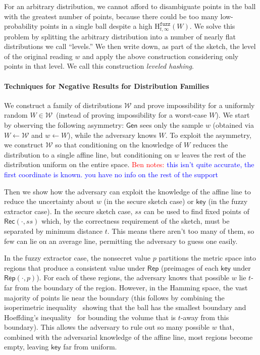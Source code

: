 \documentclass[11pt]{article}
\newcommand{\class}[1]{{\ensuremath{\mathsf{#1}}}}
\newcommand{\key}{\ensuremath{\class{key}}\xspace}
\newcommand{\gen}{\ensuremath{\class{Gen}}\xspace}
\newcommand{\rep}{\ensuremath{\class{Rep}}\xspace}
\newcommand{\rec}{\ensuremath{\class{Rec}}\xspace}
\newcommand{\Hfuzz}{\mathrm{H}^{\mathtt{fuzz}}_{t,\infty}}
\newcommand{\authnote}[2]{{\textcolor{red}{\textsf{#1 notes: }\textcolor{blue}{ #2}}\marginpar{\textcolor{red}{\textbf{!!!!!}}}}}
\newcommand{\authnote}[2]{}
\newcommand{\bnote}[1]{{\authnote{Ben}{#1}}}
\begin{document}
For an arbitrary distribution, we cannot afford to disambiguate points in the ball with the greatest number of points, because there could be too many low-probability points in a single ball despite a high $\Hfuzz(W)$.  We solve this problem by splitting the arbitrary distribution into a number of nearly flat distributions we call ``levels.''  We then write down, as part of the sketch, the level of the original reading $w$ and apply the above construction considering only points in that level.  We call this construction \emph{leveled hashing}.%

\paragraph{Techniques for Negative Results for Distribution Families}
We construct a family of distributions $\mathcal{W}$ and prove impossibility for a uniformly random $W\in \mathcal{W}$~(instead of proving impossibility for a worst-case $W$).
We start by observing the following asymmetry: $\gen$  sees only the sample $w$ (obtained via $W\leftarrow \mathcal{W}$ and $w\leftarrow W$), while
the adversary knows $W$.   To exploit the asymmetry, we construct $\mathcal{W}$ so that conditioning on the knowledge of $W$ reduces the distribution to a single affine line, but conditioning on $w$ leaves the rest of the distribution uniform on the entire space. \bnote{this isn't quite accurate, the first coordinate is known.  you have no info on the rest of the support}

Then we show how the adversary can exploit the knowledge of the affine line to reduce the uncertainty about $w$ (in the secure sketch case) or $\key$ (in the fuzzy extractor case). 
In the secure sketch case, $ss$ can be used to find fixed points of $\rec(\cdot, ss)$ which, by the correctness requirement of the sketch, must be separated by minimum distance $t$. This means there aren't too many of them, so few can lie on an average line, permitting the adversary to guess one easily.

In the fuzzy extractor case, the nonsecret value $p$ partitions the metric space into regions that produce a consistent value under $\rep$ (preimages of each $\key$ under $\rep(\cdot, p)$).  For each of these regions, the adversary knows that possible $w$ lie $t$-far from the boundary of the region.  However, in the Hamming space, the vast majority of points lie near the boundary (this follows by combining the isoperimetric inequality~\cite{harper1966optimal} showing that the ball has the smallest boundary and Hoeffding's inequality~\cite{hoeffding1963probability} for bounding the volume that is $t$-away from this boundary).  This allows the adversary to rule out so many possible $w$ that, combined with the adversarial knowledge of the affine line, most regions become empty, leaving $\key$ far from uniform.
\end{document}
